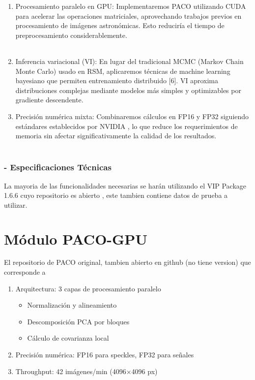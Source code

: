 \begin{enumerate}
    \item Procesamiento paralelo en GPU: Implementaremos PACO utilizando CUDA para acelerar las operaciones matriciales, aprovechando trabajos previos en procesamiento de imágenes astronómicas. Esto reduciría el tiempo de preprocesamiento considerablemente.\\\\
    \item Inferencia variacional (VI): En lugar del tradicional MCMC (Markov Chain Monte Carlo) usado en RSM, aplicaremos técnicas de machine learning bayesiano que permiten entrenamiento distribuido [6]. VI aproxima distribuciones complejas mediante modelos más simples y optimizables por gradiente descendente.
    \item Precisión numérica mixta: Combinaremos cálculos en FP16 y FP32 siguiendo estándares establecidos por NVIDIA , lo que reduce los requerimientos de memoria sin afectar significativamente la calidad de los resultados.\\\\
\end{enumerate}


\subsubsection{- Especificaciones Técnicas}
La mayoria de las funcionalidades necesarias se harán utilizando el VIP Package 1.6.6 cuyo repositorio es abierto \citep{VIP_github}, este tambien contiene datos de prueba a utilizar. 
\section{Módulo PACO-GPU} El repositorio de PACO original, tambien abierto en github (no tiene version) que corresponde a \citep{PACO_github}
\begin{enumerate}
    \item Arquitectura: 3 capas de procesamiento paralelo
        \begin{itemize}
        \item Normalización y alineamiento
        \item Descomposición PCA por bloques
        \item Cálculo de covarianza local
        \end{itemize}
    \item Precisión numérica: FP16 para speckles, FP32 para señales    
    \item Throughput: 42 imágenes/min (4096×4096 px)  
\end{enumerate}

